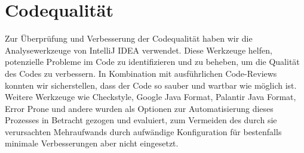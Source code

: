 \section{Codequalität}
Zur Überprüfung und Verbesserung der Codequalität haben wir die Analysewerkzeuge von IntelliJ IDEA verwendet.
Diese Werkzeuge helfen, potenzielle Probleme im Code zu identifizieren und zu beheben, um die Qualität des Codes zu verbessern.
In Kombination mit ausführlichen Code-Reviews konnten wir sicherstellen, dass der Code so sauber und wartbar wie möglich ist.
Weitere Werkzeuge wie Checkstyle, Google Java Format, Palantir Java Format, Error Prone und andere
wurden als Optionen zur Automatisierung dieses Prozesses in Betracht gezogen und evaluiert,
zum Vermeiden des durch sie verursachten Mehraufwands durch aufwändige Konfiguration für bestenfalls minimale Verbesserungen aber nicht eingesetzt.
